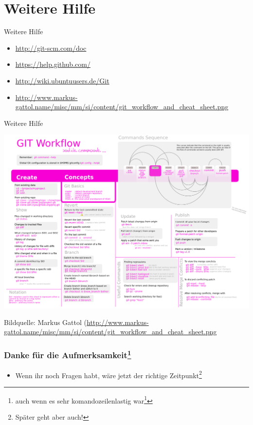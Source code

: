 \documentclass{beamer}
\begin{document}
\section{Weitere Hilfe}
\begin{frame}{Weitere Hilfe}
	\begin{itemize}
		\item \url{http://git-scm.com/doc}
		\item \url{https://help.github.com/}
		\item \url{http://wiki.ubuntuusers.de/Git}
		\item \url{http://www.markus-gattol.name/misc/mm/si/content/git_workflow_and_cheat_sheet.png}
	\end{itemize}
\end{frame}

\begin{frame}{Weitere Hilfe}
	\begin{center}
		\includegraphics[height=0.7\textheight]{git_workflow_and_cheat_sheet.png}
	\end{center}
	{\footnotesize Bildquelle: Markus Gattol (\url{http://www.markus-gattol.name/misc/mm/si/content/git_workflow_and_cheat_sheet.png}}
\end{frame}

\begin{frame}
	\frametitle{Danke für die Aufmerksamkeit\footnote{auch wenn es sehr komandozeilenlastig war\footnote{}}}
	\begin{itemize}
		\item Wenn ihr noch Fragen habt, wäre jetzt der richtige Zeitpunkt\footnote{Später geht aber auch!}
	\end{itemize}
\end{frame}
\end{document}
